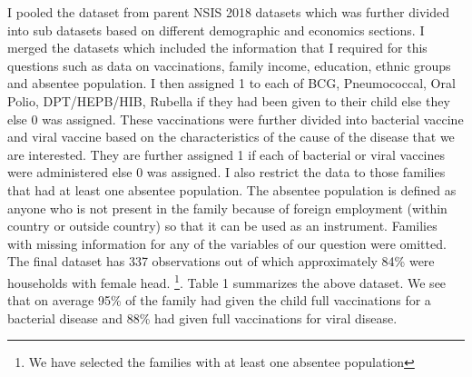 \documentclass[12pt]{article}
\begin{document}
I pooled the dataset from parent NSIS 2018 datasets which was further divided into sub datasets based on different demographic and economics sections. I merged the datasets which included the information that I required for this questions such as data on vaccinations, family income, education, ethnic groups and absentee population.
I then assigned 1 to each of BCG, Pneumococcal, Oral Polio, DPT/HEPB/HIB, Rubella if they had been given to their child else they else 0 was assigned. These vaccinations were further divided into bacterial vaccine and viral vaccine based on the characteristics of the cause of the disease that we are interested. They are further assigned 1 if each of bacterial or viral vaccines were administered else 0 was assigned. I also restrict the data to those families that had at least one absentee population. The absentee population is defined as anyone who is not present in the family because of foreign employment (within country or outside country) so that it can be used as an instrument. Families with missing information for any of the variables of our question were omitted. The final dataset has 337 observations out of which approximately 84\% were households with female head. \footnote{We have selected the families with at least one absentee population}. Table 1 summarizes the above dataset. We see that on average 95\% of the family had given the child full vaccinations for a bacterial disease and 88\% had given full vaccinations for viral disease.
\end{document}
